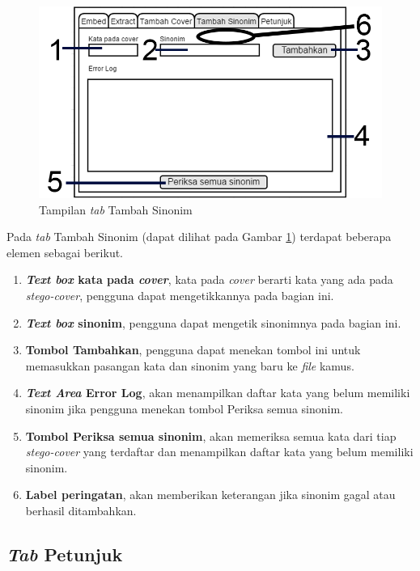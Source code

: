 \begin{figure}[H]
	\centering
	\includegraphics[scale=1.8]{Gambar/tab-tambah-sinonim}
	\caption{Tampilan \textit{tab} Tambah Sinonim} 
	\label{fig:4-tab-tambah-sinonim}
\end{figure}

Pada \textit{tab} Tambah Sinonim (dapat dilihat pada Gambar \ref{fig:4-tab-tambah-sinonim}) terdapat beberapa elemen sebagai berikut.

\begin{enumerate}
	\item \textbf{\textit{Text box} kata pada \textit{cover}}, kata pada \textit{cover} berarti kata yang ada pada \textit{stego-cover}, pengguna dapat mengetikkannya pada bagian ini.
	\item \textbf{\textit{Text box} sinonim}, pengguna dapat mengetik sinonimnya pada bagian ini.
	\item \textbf{Tombol Tambahkan}, pengguna dapat menekan tombol ini untuk memasukkan pasangan kata dan sinonim yang baru ke \textit{file} kamus.
	\item \textbf{\textit{Text Area} Error Log}, akan menampilkan daftar kata yang belum memiliki sinonim jika pengguna menekan tombol Periksa semua sinonim.
	\item \textbf{Tombol Periksa semua sinonim}, akan memeriksa semua kata dari tiap \textit{stego-cover} yang terdaftar dan menampilkan daftar kata yang belum memiliki sinonim.
	\item \textbf{Label peringatan}, akan memberikan keterangan jika sinonim gagal atau berhasil ditambahkan.
\end{enumerate} 

\subsection{\textit{Tab} Petunjuk}

